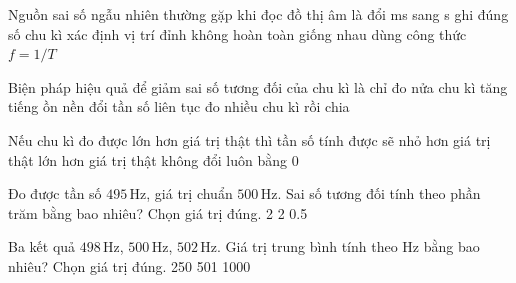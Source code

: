 \begin{ex}
Nguồn sai số ngẫu nhiên thường gặp khi đọc đồ thị âm là
\choice
{đổi ms sang s}
{ghi đúng số chu kì}
{\True xác định vị trí đỉnh không hoàn toàn giống nhau}
{dùng công thức $f=1/T$}
\end{ex}

\begin{ex}
Biện pháp hiệu quả để giảm sai số tương đối của chu kì là
\choice
{chỉ đo nửa chu kì}
{tăng tiếng ồn nền}
{đổi tần số liên tục}
{\True đo nhiều chu kì rồi chia}
\end{ex}

\begin{ex}
Nếu chu kì đo được lớn hơn giá trị thật thì tần số tính được sẽ
\choice
{\True nhỏ hơn giá trị thật}
{lớn hơn giá trị thật}
{không đổi}
{luôn bằng 0}
\end{ex}

\begin{ex}
Đo được tần số $495\,\text{Hz}$, giá trị chuẩn $500\,\text{Hz}$. Sai số tương đối tính theo phần trăm bằng bao nhiêu? Chọn giá trị đúng.
\choice
{2}
{}
{2}
{0.5}
\end{ex}

\begin{ex}
Ba kết quả $498\,\text{Hz}$, $500\,\text{Hz}$, $502\,\text{Hz}$. Giá trị trung bình tính theo Hz bằng bao nhiêu? Chọn giá trị đúng.
\choice
{250}
{501}
{}
{1000}
\end{ex}

